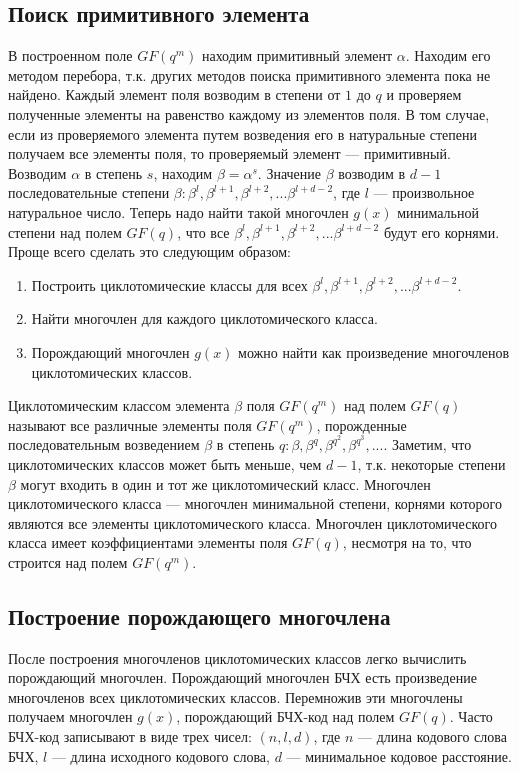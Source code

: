 \subsection{Поиск примитивного элемента}
В построенном поле $GF(q^m)$ находим примитивный элемент $\alpha$. Находим его методом перебора, т.к. других 
методов поиска примитивного элемента пока не найдено. Каждый элемент поля возводим в степени от $1$ до $q$ и 
проверяем полученные элементы на равенство каждому из элементов поля. В том случае, если из проверяемого 
элемента путем возведения его в натуральные степени получаем все элементы поля, то проверяемый элемент --- 
примитивный.
Возводим $\alpha$ в степень $s$, находим $\beta=\alpha^s$. Значение $\beta$ возводим в $d-1$ последовательные 
степени $\beta: \beta^l, \beta^{l+1}, \beta^{l+2}, ... \beta^{l+d-2}$, где $l$ --- произвольное натуральное 
число.
Теперь надо найти такой многочлен $g(x)$ минимальной степени над полем $GF(q)$, что все $\beta^l, \beta^{l+1}
, \beta^{l+2}, ... \beta^{l+d-2}$ будут его корнями. Проще всего сделать это следующим образом:
\begin{enumerate}
  \item Построить циклотомические классы для всех $\beta^l, \beta^{l+1}, \beta^{l+2}, ... \beta^{l+d-2}$.
  \item Найти многочлен для каждого циклотомического класса.
  \item Порождающий многочлен $g(x)$ можно найти как произведение многочленов циклотомических классов.
\end{enumerate}
Циклотомическим классом элемента $\beta$ поля $GF(q^m)$ над полем $GF(q)$ называют все различные элементы 
поля $GF(q^m)$, порожденные последовательным возведением $\beta$ в степень $q: \beta, \beta^q, \beta^{q^2}, 
\beta^{q^3}, ...$.
Заметим, что циклотомических классов может быть меньше, чем $d-1$, т.к. некоторые степени $\beta$ могут 
входить в один и тот же циклотомический класс. 
Многочлен циклотомического класса --- многочлен минимальной степени, корнями которого являются все элементы 
циклотомического класса. Многочлен циклотомического класса имеет коэффициентами элементы поля $GF(q)$, 
несмотря на то, что строится над полем $GF(q^m)$. 

\subsection{Построение порождающего многочлена}
После построения многочленов циклотомических классов легко вычислить порождающий многочлен. Порождающий 
многочлен БЧХ есть произведение многочленов всех циклотомических классов. Перемножив эти многочлены получаем 
многочлен $g(x)$, порождающий БЧХ-код над полем $GF(q)$. Часто БЧХ-код записывают в виде трех чисел: $(n, l, d
)$, где $n$ --- длина кодового слова БЧХ, $l$ --- длина исходного кодового слова, $d$ --- минимальное кодовое 
расстояние. 

